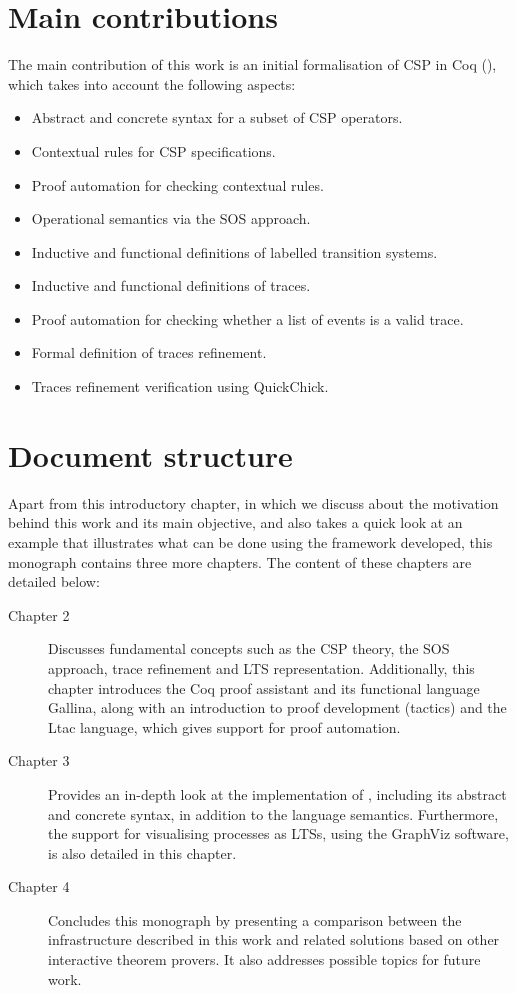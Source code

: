 \section{Main contributions}

The main contribution of this work is an initial formalisation of CSP in Coq (\CSPcoq{}), which takes into account the following aspects:

\begin{itemize}
	\item Abstract and concrete syntax for a subset of CSP operators.
	\item Contextual rules for CSP specifications.
	\item Proof automation for checking contextual rules.
	\item Operational semantics via the SOS approach.
	\item Inductive and functional definitions of labelled transition systems.
	\item Inductive and functional definitions of traces.
	\item Proof automation for checking whether a list of events is a valid trace.
	\item Formal definition of traces refinement.
	\item Traces refinement verification using QuickChick.
\end{itemize}

\section{Document structure}

Apart from this introductory chapter, in which we discuss about the motivation behind this work and its main objective, and also takes a quick look at an example that illustrates what can be done using the framework developed, this monograph contains three more chapters. The content of these chapters are detailed below:

\begin{description}
	\item [Chapter 2] Discusses fundamental concepts such as the CSP theory, the SOS approach, trace refinement and LTS representation. Additionally, this chapter introduces the Coq proof assistant and its functional language Gallina, along with an introduction to proof development (tactics) and the Ltac language, which gives support for proof automation.
	\item [Chapter 3] Provides an in-depth look at the implementation of \CSPcoq{}, including its abstract and concrete syntax, in addition to the language semantics. Furthermore, the support for visualising processes as LTSs, using the GraphViz software, is also detailed in this chapter.
	\item [Chapter 4] Concludes this monograph by presenting a comparison between the infrastructure described in this work and related solutions based on other interactive theorem provers. It also addresses possible topics for future work.
\end{description}